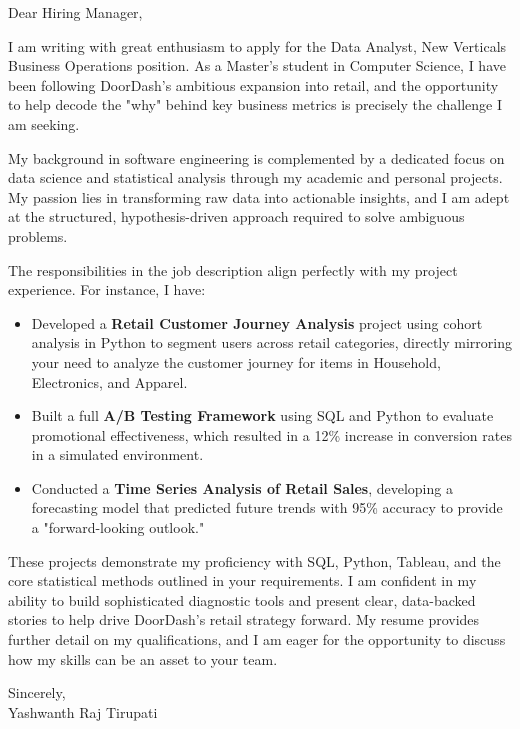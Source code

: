 \documentclass[letterpaper,11pt]{article}
\begin{document}
\begin{flushleft}
Dear Hiring Manager,

\vspace{12pt}

I am writing with great enthusiasm to apply for the Data Analyst, New Verticals Business Operations position. As a Master’s student in Computer Science, I have been following DoorDash’s ambitious expansion into retail, and the opportunity to help decode the "why" behind key business metrics is precisely the challenge I am seeking.

\vspace{12pt}

My background in software engineering is complemented by a dedicated focus on data science and statistical analysis through my academic and personal projects. My passion lies in transforming raw data into actionable insights, and I am adept at the structured, hypothesis-driven approach required to solve ambiguous problems.

\vspace{12pt}

The responsibilities in the job description align perfectly with my project experience. For instance, I have:

\begin{itemize}
    \item Developed a \textbf{Retail Customer Journey Analysis} project using cohort analysis in Python to segment users across retail categories, directly mirroring your need to analyze the customer journey for items in Household, Electronics, and Apparel.
    \item Built a full \textbf{A/B Testing Framework} using SQL and Python to evaluate promotional effectiveness, which resulted in a 12\% increase in conversion rates in a simulated environment.
    \item Conducted a \textbf{Time Series Analysis of Retail Sales}, developing a forecasting model that predicted future trends with 95\% accuracy to provide a "forward-looking outlook."
\end{itemize}

\vspace{2pt}

These projects demonstrate my proficiency with SQL, Python, Tableau, and the core statistical methods outlined in your requirements. I am confident in my ability to build sophisticated diagnostic tools and present clear, data-backed stories to help drive DoorDash's retail strategy forward. My resume provides further detail on my qualifications, and I am eager for the opportunity to discuss how my skills can be an asset to your team.

\vspace{20pt}

Sincerely, \\
Yashwanth Raj Tirupati

\end{flushleft}
\end{document}

